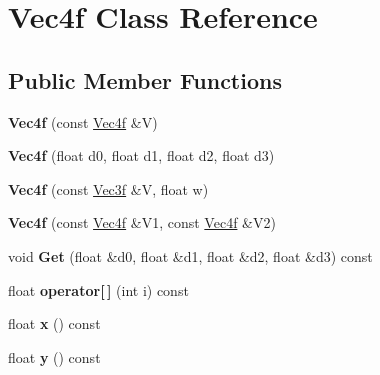 \hypertarget{classVec4f}{\section{\-Vec4f \-Class \-Reference}
\label{classVec4f}
}
\subsection*{\-Public \-Member \-Functions}
\begin{DoxyCompactItemize}
\item 
\hypertarget{classVec4f_acada261ab1deeff0aecb2b717300cecc}{{\bfseries \-Vec4f} (const \hyperlink{classVec4f}{\-Vec4f} \&\-V)}\label{classVec4f_acada261ab1deeff0aecb2b717300cecc}

\item 
\hypertarget{classVec4f_a2d79033898fd342979f9da1f5a318a5a}{{\bfseries \-Vec4f} (float d0, float d1, float d2, float d3)}\label{classVec4f_a2d79033898fd342979f9da1f5a318a5a}

\item 
\hypertarget{classVec4f_af93eaed53706e0c147c49846a43cbf5e}{{\bfseries \-Vec4f} (const \hyperlink{classVec3f}{\-Vec3f} \&\-V, float w)}\label{classVec4f_af93eaed53706e0c147c49846a43cbf5e}

\item 
\hypertarget{classVec4f_aeb03d44ccc6993f691d4750abcf742a6}{{\bfseries \-Vec4f} (const \hyperlink{classVec4f}{\-Vec4f} \&\-V1, const \hyperlink{classVec4f}{\-Vec4f} \&\-V2)}\label{classVec4f_aeb03d44ccc6993f691d4750abcf742a6}

\item 
\hypertarget{classVec4f_ac50e2b42ece0ea38319a1da0e35f2901}{void {\bfseries \-Get} (float \&d0, float \&d1, float \&d2, float \&d3) const }\label{classVec4f_ac50e2b42ece0ea38319a1da0e35f2901}

\item 
\hypertarget{classVec4f_a642f9dd8ba277449ad7e0adc758c75a8}{float {\bfseries operator\mbox{[}$\,$\mbox{]}} (int i) const }\label{classVec4f_a642f9dd8ba277449ad7e0adc758c75a8}

\item 
\hypertarget{classVec4f_a25f2284456fd28a42c0b4e385f968a17}{float {\bfseries x} () const }\label{classVec4f_a25f2284456fd28a42c0b4e385f968a17}

\item 
\hypertarget{classVec4f_a2ee69c55784c64a50cc2e0c5eaa974d7}{float {\bfseries y} () const }\label{classVec4f_a2ee69c55784c64a50cc2e0c5eaa974d7}


\end{DoxyCompactItemize}
